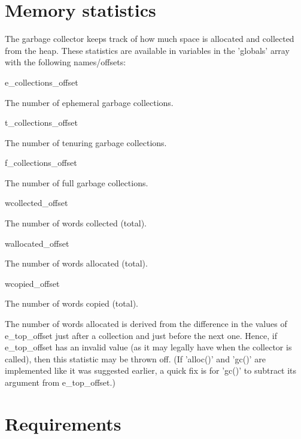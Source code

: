 \section{Memory statistics}

The garbage collector keeps track of how much space is allocated and
collected from the heap. These statistics are available in variables
in the 'globals' array with the following names/offsets:

\begin{description}
\item {\sc e\_collections\_offset}

 The number of ephemeral garbage collections.

\item {\sc t\_collections\_offset}

    The number of tenuring garbage collections.

\item {\sc f\_collections\_offset}

    The number of full garbage collections.

\item {\sc wcollected\_offset}

       The number of words collected (total).

\item {\sc wallocated\_offset}

       The number of words allocated (total).

\item {\sc wcopied\_offset}

          The number of words copied (total).
\end{description}

The number of words allocated is derived from the difference in the
values of {\sc e\_top\_offset} just after a collection and just before the next
one. Hence, if {\sc e\_top\_offset} has an invalid value (as it may legally have
when the collector is called), then this statistic may be thrown off.
(If 'alloc()' and 'gc()' are implemented like it was suggested earlier,
a quick fix is for 'gc()' to subtract its argument from {\sc e\_top\_offset}.)


\section{Requirements}

